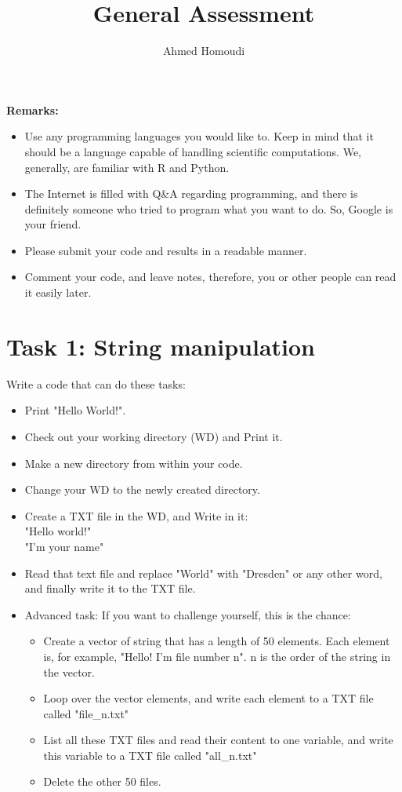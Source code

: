 \documentclass{article}
\title{General Assessment}
\author{Ahmed Homoudi} %
\begin{document}
\maketitle
\noindent 


\noindent
\textbf{Remarks:} 
\begin{itemize}
\item Use any programming languages you would like to. Keep in mind that it should be a language capable of handling scientific computations. We, generally, are familiar with R and Python.
\item The Internet is filled with Q\&A regarding programming, and there is definitely someone who tried to program what you want to do. So, Google is your friend.
\item Please submit your code and results in a readable manner. 
\item Comment your code, and leave notes, therefore, you or other people can read it easily later. 
\end{itemize}

\section{Task 1: String manipulation}
Write a code that can do these tasks: 

\begin{itemize}
\item Print "Hello World!". 
\item Check out your working directory (WD) and Print it.
\item Make a new directory from within your code. 
\item Change your WD to the newly created directory. 
\item Create a TXT file in the WD, and Write in it: \\
               "Hello world!"\\
               "I'm your name"
\item Read that text file and replace "World" with "Dresden" or any other word, and finally write it to the TXT file. 
    
\item Advanced task: If you want to challenge yourself, this is the chance: 
    \begin{itemize}
    \item Create a vector of string that has a length of 50 elements. Each element is, for example, "Hello! I'm file number n". n is the order of the string in the vector. 
    \item Loop over the vector elements, and write each element to a TXT file called "file\_n.txt"
    \item List all these TXT files and read their content to one variable, and write this variable to a TXT file called "all\_n.txt"
    \item Delete the other 50 files. 
    \end{itemize}
\end{itemize}
\end{document}
